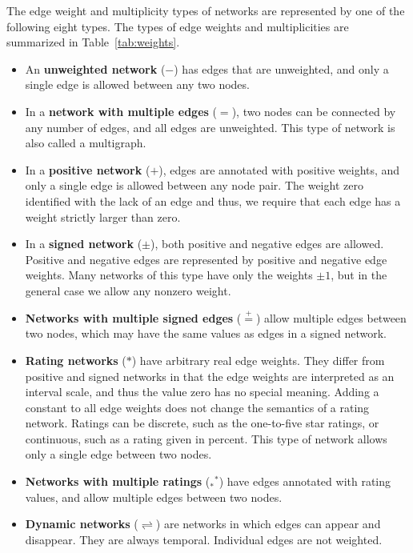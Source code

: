 \documentclass{article}
\begin{document}
The edge weight and multiplicity types of networks are represented by
one of the following eight types. 
The types of edge weights and multiplicities are summarized in
Table~\ref{tab:weights}. 
\begin{itemize}
\item An \textbf{unweighted network} ($-$) 
  has edges that are
  unweighted, and only a 
  single edge is allowed between any two nodes.  
\item In a \textbf{network with multiple edges} ($=$), 
  two nodes can be
  connected by any number of edges, and all edges are unweighted. This
  type of network is also called a multigraph.  
\item In a \textbf{positive network} ($+$), 
  edges are annotated
  with positive weights, and only a single edge is allowed between
  any node pair.  The weight zero identified with the lack of an edge
  and thus, we require that each edge has a weight strictly larger than
  zero. 
\item In a \textbf{signed network} ($\pm$), 
  both positive and negative
  edges are 
  allowed. Positive and negative edges are represented by positive and
  negative edge weights. Many networks of this type have only the
  weights $\pm 1$, but in the general case we allow any nonzero weight.
\item \textbf{Networks with multiple signed edges} ($\stackrel{+}{=}$) 
  allow multiple edges between two nodes, which may have the same values
  as edges in a signed network.
\item \textbf{Rating networks} ($*$) 
  have arbitrary real edge weights.  They
  differ from positive and signed networks in that the edge weights are
  interpreted as an interval scale, and thus the value zero has no
  special meaning.  Adding a constant to all edge weights does not
  change the semantics of a rating network. 
  Ratings can be discrete, such as the one-to-five star ratings, or
  continuous, such as a rating given in percent. 
  This type of network allows only a single edge between two nodes. 
\item \textbf{Networks with multiple ratings} ($_*{}^*$) 
  have edges annotated
  with rating values, and allow multiple edges between two nodes.
\item \textbf{Dynamic networks} ($\rightleftharpoons$) are networks in
  which edges can appear and disappear.  They are always
  temporal. Individual edges are not weighted. 
\end{itemize}
\end{document}
